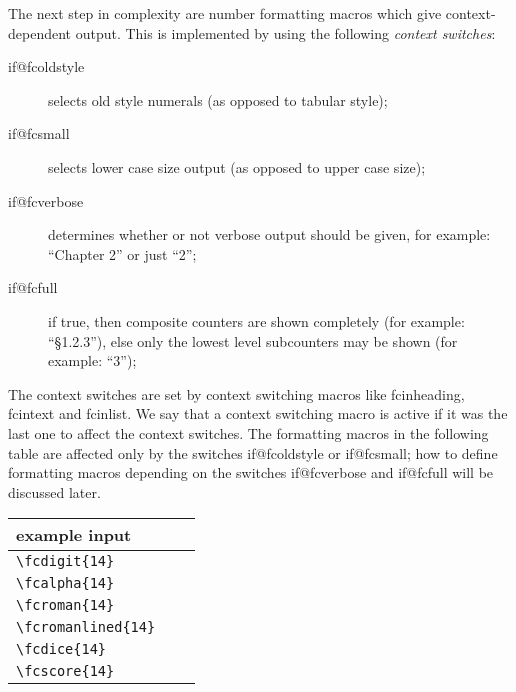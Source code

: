 \documentclass[11pt]{article}
\makeatletter
\def\macroname#1{{\ttfamily\@ttbs#1}}  %
\def\={\verb=}
\def\<#1>{\macroname{#1}}
\makeatother
\begin{document}
The next step in complexity are number formatting macros which give
context-dependent output. This is implemented by using the following
{\it context switches}:
\begin{description}
\item[\<if@fcoldstyle>] selects old style numerals
  (as opposed to tabular style);
\item[\<if@fcsmall>] selects lower case size output
  (as opposed to upper case size);
\item[\<if@fcverbose>] determines whether or not verbose output should
  be given, for example: ``Chapter 2'' or just ``2'';
\item[\<if@fcfull>] if true, then composite counters are shown
  completely (for example: ``\S 1.2.3''), else only the lowest level
  subcounters may be shown (for example: ``3'');
\end{description}

The context switches are set by
context switching macros like \<fcinheading>, \<fcintext> and
\<fcinlist>. We say that a context switching macro is active if it was
the last one to affect the context switches.
The formatting macros in the following table are affected only by
the switches \<if@fcoldstyle> or \<if@fcsmall>; how to define formatting
macros depending on the switches \<if@fcverbose> and \<if@fcfull> will be discussed
later.
\begin{center}
\begin{tabular}{|l|c|c|}\hline
  example input         & \vbox{\hbox{output when\strut}%
                            \hbox{\<fcinheading>\strut}%
                            \hbox{is active\strut}}
                                              & \vbox{\hbox{output when\strut}%
                                                    \hbox{\<fcintext>\strut}%
                                                    \hbox{is active\strut}}  \\
\hline\hline
  \=\fcdigit{14}=      & {\fcinheading\fcdigit{14}} & {\fcintext\fcdigit{14}} \\
\hline
  \=\fcalpha{14}=      & {\fcinheading\fcalpha{14}} & {\fcintext\fcalpha{14}} \\
\hline
  \=\fcroman{14}=      & {\fcinheading\fcroman{14}} & {\fcintext\fcroman{14}} \\
\hline
  \=\fcromanlined{14}= & {\fcinheading\fcromanlined{14}}
                                              & {\fcintext\fcromanlined{14}} \\
\hline
  \=\fcdice{14}=       & {\fcinheading\fcdice{14}}  & {\fcintext\fcdice{14}}  \\
\hline
  \=\fcscore{14}=      & {\fcinheading\fcscore{14}} & {\fcintext\fcscore{14}} \\
\hline
\end{tabular}
\end{center}
\end{document}
